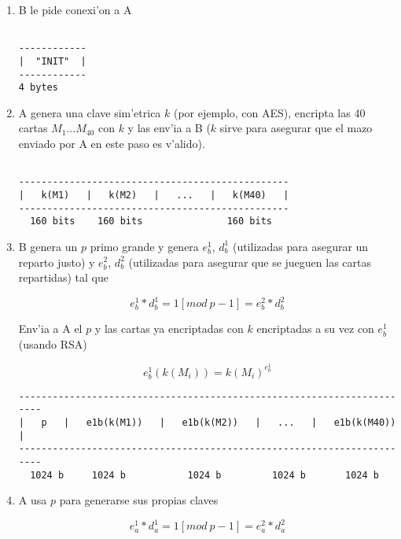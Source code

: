 \begin{enumerate}

\item B le pide conexi'on a A

\begin{verbatim}

------------
|  "INIT"  |
------------
4 bytes

\end{verbatim}




\item A genera una clave sim'etrica $k$ (por ejemplo, con AES), encripta las 40 cartas $M_1...M_40$ con $k$ y las env'ia a B ($k$ sirve para asegurar que el mazo enviado por A en este paso es v'alido).

\begin{verbatim}

------------------------------------------------
|   k(M1)   |   k(M2)   |   ...   |   k(M40)   |
------------------------------------------------
  160 bits    160 bits               160 bits

\end{verbatim}

  


\item B genera un $p$ primo grande y genera $e^1_b$, $d^1_b$ (utilizadas para asegurar un reparto justo) y  $e^2_b$, $d^2_b$ (utilizadas para asegurar que se jueguen las cartas repartidas) tal que

$$	e^1_b * d^1_b = 1 [mod\ p-1] = e^2_b * d^2_b $$

Env'ia a A el $p$ y las cartas ya encriptadas con $k$ encriptadas a su vez con $e^1_b$ (usando RSA)

$$	e^1_b(k(M_i)) = k(M_i)^{e^1_b} $$
	

\begin{verbatim}
-----------------------------------------------------------------------
|   p   |   e1b(k(M1))   |   e1b(k(M2))   |   ...   |   e1b(k(M40))   |
-----------------------------------------------------------------------
  1024 b     1024 b           1024 b         1024 b       1024 b       
\end{verbatim}


  


\item A usa $p$ para generarse sus propias claves

$$	e^1_a * d^1_a = 1 [mod\ p-1] = e^2_a * d^2_a $$


\end{enumerate}
